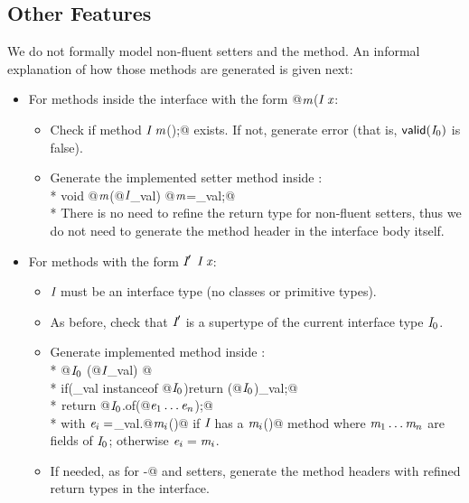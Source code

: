 \subsection{Other Features}

We do not formally model non-fluent setters and the \Q@with@ method.
An informal explanation of how those methods are generated is given next:
\begin{itemize}
\item For methods inside the interface with the form \Q@void @$\textit{m}$\QM($\C\ \x$\QM{);}:
  \begin{itemize}
    \item Check if method $\textit{I}\ \textit{m}$\Q@();@ exists. If not, generate error (that
      is, $\textsf{valid}(\textit{I}_0)$ is false).
    \item Generate the implemented setter method inside \Q@of@:\\*
      \Q@public void @$\textit{m}$\Q@(@$\textit{I}$\Q@ _val) { @$\textit{m}$\Q@=_val;}@\\*
      There is no need to refine the return type for non-fluent setters, thus we
      do not need to generate the method header in the interface body itself.
    \end{itemize}
\item For methods with the form $\C'\ $$\C\ \x$\QM{);}:
  \begin{itemize}
   \item $\textit{I}$ must be an interface type (no classes or primitive types).
    \item As before, check that $\textit{I}'$ is a supertype of the current interface type $\textit{I}_0$.
    \item Generate implemented \Q@with@ method inside \Q@of@:\\*
           \Q@public @$\textit{I}_0\ $\Q@with(@$\textit{I}$\Q@ _val) { @\\*
           \Q@  if(_val instanceof @$\textit{I}_0$\Q@){return (@$\textit{I}_0$\Q@)_val;}@\\*
${}_{}$\Q@  return @$\textit{I}_0$\Q@.of(@$\textit{e}_1\ldots\textit{e}_n$\Q@);}@\\*
 with $\textit{e}_i=$\Q@_val.@$\textit{m}_i$\Q@()@ if $\textit{I}$ has a $\textit{m}_i$\Q@()@ method where
 $\textit{m}_1\ldots\textit{m}_n$ are fields of $\textit{I}_0$; otherwise $\textit{e}_i=\textit{m}_i$.
    \item If needed, as for \Q@with-@ and setters, generate the method headers with refined return types in the interface.
 \end{itemize}

\end{itemize}
